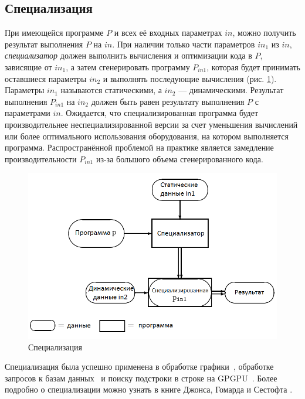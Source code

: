 \subsection{Специализация}
При имеющейся программе $P$ и всех её входных параметрах 
$in$, можно получить результат выполнения $P$ на $in$.
При наличии только части параметров $in_1$ из $in$, 
\emph{специализатор} должен выполнить
вычисления и оптимизации кода в $P$, зависящие от $in_1$, 
а затем сгенерировать программу $P_{in1}$, 
которая будет принимать оставшиеся параметры $in_2$ и 
выполнять последующие вычисления (рис. \ref{spec}).
Параметры $in_1$ называются статическими, 
а $in_2$ --- динамическими.
Результат выполнения $P_{in1}$ на $in_2$ должен быть равен 
результату выполнения $P$ с параметрами $in$.
Ожидается, что специализированная программа будет 
производительнее неспециализированной версии за счет 
уменьшения вычислений или более оптимального использования 
оборудования, на котором выполняется программа.
Распространённой проблемой на практике является замедление 
производительности $P_{in1}$ из-за большого объема 
сгенерированного кода.
\begin{figure}
  \centering
  \includegraphics[width=\columnwidth]{spec.png}
  \caption{Специализация~\cite{Jones_spec}}
  \label{spec}
\end{figure}

Специализация была успешно применена в обработке 
графики~\cite{RT_spec}, обработке запросов к базам 
данных~\cite{SQL_spec} и поиску подстроки в строке на 
GPGPU~\cite{part_eval_GPU}.
Более подробно о специализации можно узнать в книге Джонса, 
Гомарда и Сестофта \cite{Jones_spec}.